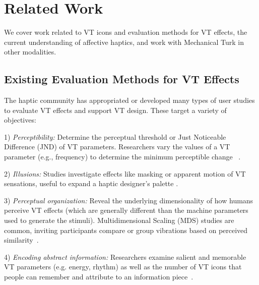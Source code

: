 \section{Related Work}
We cover work related to VT icons and evaluation methods for VT effects, the current understanding of affective haptics, and work with Mechanical Turk in other modalities.
     
		
\subsection{Existing Evaluation Methods for VT Effects} 

The haptic community has appropriated or developed many types of user studies to evaluate VT effects and support VT design.
These target a variety of objectives:

1) {\em Perceptibility:} Determine the perceptual threshold or Just Noticeable Difference (JND) of VT parameters. Researchers vary the values of a VT parameter (e.g., frequency)
to determine the minimum perceptible change
~\cite{JNDstudy,foundationsoftactile}. 

2) {\em Illusions:} Studies investigate effects like masking or apparent motion of VT sensations, useful to expand a haptic designer's palette \cite{Hayward2008,Israr2011a,Seo2013}.

3) {\em Perceptual organization:} Reveal the underlying dimensionality of how humans perceive VT effects (which are generally different than the machine parameters used to generate the stimuli).
Multidimensional Scaling (MDS) studies are common, inviting participants compare or group vibrations based on perceived similarity~\cite{Hollins93,van2003distilling,Pasquero2006,Chan2008,Ternes2008}.

4) {\em Encoding abstract information:} Researchers examine salient and memorable VT parameters (e.g. energy, rhythm) as well as the number of VT icons that people can remember and attribute to an information piece~\cite{Brown2006a,Allen2005,Chan2008,Ternes2008}.

